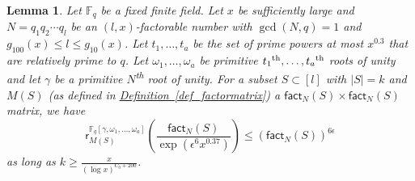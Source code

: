 \documentclass[11pt]{article}
\numberwithin{equation}{section}
\newtheorem{lemma}[theorem]{Lemma}
\theoremstyle{definition}
\theoremstyle{plain}
\newcommand{\expref}[2]{\hyperref[#2]{#1~\ref{#2}}}
\theoremstyle{definition}
\newcommand\F{{\mathbb{F}}}
\renewcommand\fact{\textsf{fact}}
\newcommand{\ts}{\textsuperscript}
\begin{document}
\begin{lemma}\label{lem_finitefieldblocks}
Let $\F_q$ be a fixed finite field.  Let $x$ be sufficiently large and $N = q_1q_2\cdots q_l$ be an $(l, x)$-factorable number with $\gcd(N,q) = 1$ and $g_{100}(x) \leq l \leq g_{10}(x)$. Let $t_1, \dots , t_a$ be the set of prime powers at most $x^{0.3}$ that are relatively prime to $q$.  Let $\omega_1, \dots , \omega_a$ be primitive $t_1\ts{th}, \dots , t_a\ts{th}$ 
roots of unity and let $\gamma$ be a primitive $N$\ts{th} root of unity.  For a subset $S \subset [l]$ with $|S| = k$ and $M(S)$ (as defined in \expref{Definition}{def_factormatrix})  a  $\fact_N(S) \times \fact_N(S)$ matrix,  we have 
\[
\textsf{r}^{\F_q[\gamma, \omega_1, \dots , \omega_a]}_{M(S)}\left( \frac{\fact_N(S)}{\exp\left(\epsilon^6 x^{0.37}\right)} \right) \leq \left(\fact_N(S)\right)^{6 \epsilon}
\]
as long as $k \geq \frac{x}{(\log x)^{C_0 + 200}}$.
\end{lemma}
\end{document}

